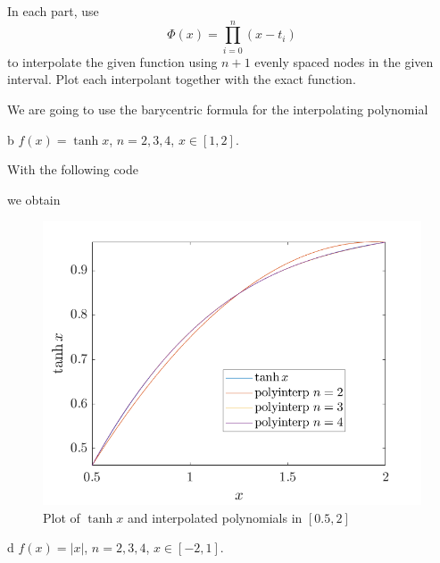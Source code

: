 \begin{statement}{3}
  In each part, use
  \[
    \Phi(x) = \prod_{i = 0}^n (x - t_i)
  \]
  to interpolate the given function using $n + 1$ evenly spaced
  nodes in the given interval. Plot each interpolant together with the exact function.
\end{statement}

\begin{solution}
  We are going to use the barycentric formula for the interpolating polynomial
  
\end{solution}

\begin{statement}{b}
  $f(x) = \tanh x$, $n = 2, 3, 4$, $x \in [1, 2]$.
\end{statement}

\begin{solution}
  With the following code
  
  we obtain
  \begin{figure}[H]
    \centering
    \includegraphics[scale=0.5]{graphics/plot-03-02.png}
    \caption{Plot of $\tanh x$ and interpolated polynomials in $[0.5, 2]$}
  \end{figure}
\end{solution}

\begin{statement}{d}
  $f(x) = |x|$, $n = 2, 3, 4$, $x \in [-2, 1]$.
\end{statement}

